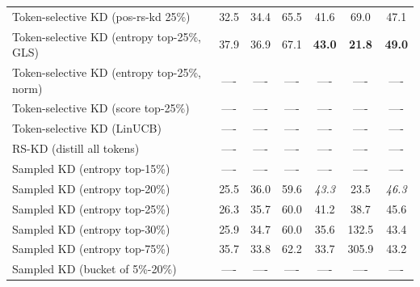 \documentclass[11pt]{article}
\begin{document}
\begin{table}[t]
{\begin{tabular}{lcccccc}
		Token-selective KD (pos-rs-kd 25\%)        & 32.5                  & 34.4                      & 65.5                 & 41.6                        & 69.0                    & 47.1          \\
		Token-selective KD (entropy top-25\%, GLS) & 37.9                  & 36.9                      & 67.1                 & \textbf{43.0}               & \textbf{21.8}           & \textbf{49.0} \\
		Token-selective KD (entropy top-25\%, norm)& ----                  & ----                      & ----                 & ----                        & ----                    & ----          \\
		Token-selective KD (score top-25\%)        & ----                  & ----                      & ----                 & ----                        & ----                    & ----          \\
		Token-selective KD (LinUCB)			       & ----                  & ----                      & ----                 & ----                        & ----                    & ----          \\
		\midrule
		RS-KD (distill all tokens)	               & ----                  & ----                      & ----                 & ----                        & ----                    & ----          \\
		Sampled KD (entropy top-15\%)              & ----                  & ----                      & ----                 & ----                        & ----                    & ----          \\
		Sampled KD (entropy top-20\%)              & 25.5                  & 36.0                      & 59.6                 & \textit{43.3}               & 23.5                    & \textit{46.3} \\
		Sampled KD (entropy top-25\%)              & 26.3                  & 35.7                      & 60.0                 & 41.2                        & 38.7                    & 45.6          \\
		Sampled KD (entropy top-30\%)              & 25.9                  & 34.7                      & 60.0                 & 35.6                        & 132.5                   & 43.4          \\
		Sampled KD (entropy top-75\%)              & 35.7                  & 33.8                      & 62.2                 & 33.7                        & 305.9                   & 43.2          \\
		Sampled KD (bucket of 5\%-20\%)  		   & ----                  & ----                      & ----                 & ----                        & ----                    & ----          \\

\end{tabular}}
\end{table}
\end{document}
